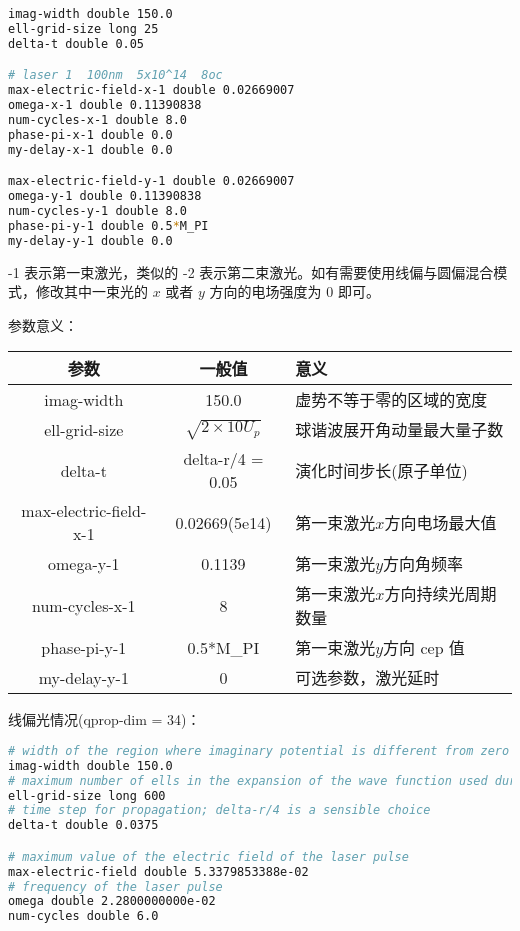 \begin{lstlisting}[language=bash]
imag-width double 150.0
ell-grid-size long 25
delta-t double 0.05

# laser 1  100nm  5x10^14  8oc
max-electric-field-x-1 double 0.02669007
omega-x-1 double 0.11390838
num-cycles-x-1 double 8.0
phase-pi-x-1 double 0.0
my-delay-x-1 double 0.0

max-electric-field-y-1 double 0.02669007
omega-y-1 double 0.11390838
num-cycles-y-1 double 8.0
phase-pi-y-1 double 0.5*M_PI
my-delay-y-1 double 0.0
\end{lstlisting}

-1 表示第一束激光，类似的 -2 表示第二束激光。如有需要使用线偏与圆偏混合模式，修改其中一束光的 $x$ 或者 $y$ 方向的电场强度为 0 即可。


参数意义：
\begin{table}[htbp]
    \begin{tabular}{c|c|l}
    \hline
    参数 & 一般值 & 意义 \\
    \hline
    imag-width & 150.0 & 虚势不等于零的区域的宽度 \\
    ell-grid-size & $\sqrt{2 \times 10 U_p}$ & 球谐波展开角动量最大量子数 \\
    delta-t & delta-r/4 = 0.05 & 演化时间步长(原子单位) \\
    max-electric-field-x-1 & 0.02669(5e14) & 第一束激光$x$方向电场最大值 \\
    omega-y-1 & 0.1139 & 第一束激光$y$方向角频率 \\
    num-cycles-x-1 & 8 & 第一束激光$x$方向持续光周期数量 \\
    phase-pi-y-1 & 0.5*M\_PI & 第一束激光$y$方向 cep 值 \\
    my-delay-y-1 & 0 & 可选参数，激光延时 \\
    \hline
    \end{tabular}
\end{table}

线偏光情况(qprop-dim = 34)：

\begin{lstlisting}[language=bash]
# width of the region where imaginary potential is different from zero
imag-width double 150.0
# maximum number of ells in the expansion of the wave function used during time propagation
ell-grid-size long 600
# time step for propagation; delta-r/4 is a sensible choice
delta-t double 0.0375

# maximum value of the electric field of the laser pulse
max-electric-field double 5.3379853388e-02
# frequency of the laser pulse
omega double 2.2800000000e-02
num-cycles double 6.0
\end{lstlisting}

